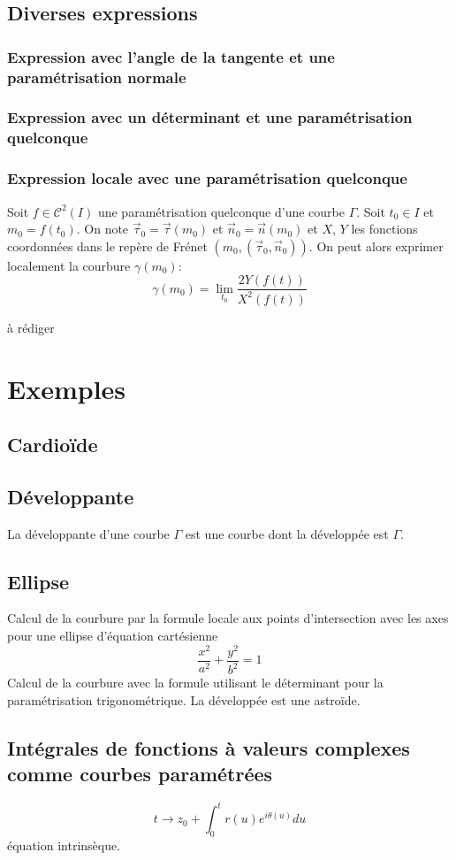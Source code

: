 \subsection{Diverses expressions}
\subsubsection{Expression avec l'angle de la tangente et une paramétrisation normale}
\subsubsection{Expression avec un déterminant et une paramétrisation quelconque}
\subsubsection{Expression locale avec une paramétrisation quelconque}
\begin{prop}
 Soit $f\in \mathcal{C}^2(I)$ une paramétrisation quelconque d'une courbe $\Gamma$. Soit $t_0\in I$ et $m_0=f(t_0)$. On note $\overrightarrow{\tau}_0=\overrightarrow{\tau}(m_0)$ et $\overrightarrow{n}_0= \overrightarrow{n}(m_0)$ et $X$, $Y$ les fonctions coordonnées dans le repère de Frénet $(m_0,(\overrightarrow{\tau}_0,\overrightarrow{n}_0))$.\newline
On peut alors exprimer localement la courbure $\gamma(m_0)$:
\begin{displaymath}
 \gamma(m_0)=\lim_{t_0}\frac{2Y(f(t))}{X^2(f(t))}
\end{displaymath}
\end{prop}
\begin{demo}
 à rédiger
\end{demo}


\section{Exemples}
\subsection{Cardioïde}
\subsection{Développante}
La développante d'une courbe $\Gamma$ est une courbe dont la développée est $\Gamma$.
\subsection{Ellipse}
Calcul de la courbure par la formule locale aux points d'intersection avec les axes pour une ellipse d'équation cartésienne
\begin{displaymath}
 \dfrac{x^2}{a^2} + \dfrac{y^2}{b^2}=1
\end{displaymath}
Calcul de la courbure avec la formule utilisant le déterminant pour la paramétrisation trigonométrique. La développée est une astroïde.
\subsection{Intégrales de fonctions à valeurs complexes comme courbes paramétrées}
\begin{displaymath}
 t \rightarrow z_0 + \int_{0}^{t}r(u)e^{i\theta(u)}du
\end{displaymath}
équation intrinsèque.

